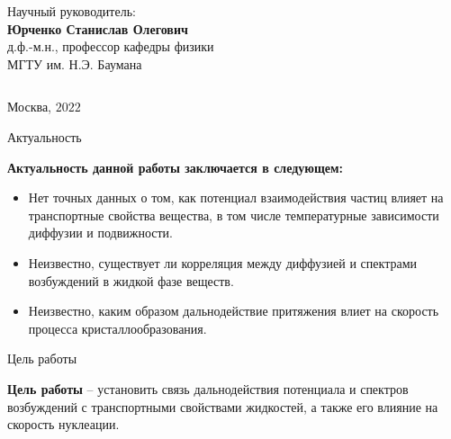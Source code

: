 \documentclass{beamer}
\begin{document}
\begin{frame}
\begin{columns}
\begin{column}{0.50\textwidth}
\begin{center}
\tiny Научный руководитель:\\
\vspace{0.1cm}
\tiny \textbf{Юрченко Станислав Олегович} \\
\tiny д.ф.-м.н., профессор кафедры физики\\
\tiny МГТУ им. Н.Э. Баумана \\
\end{center}


\end{column}
\end{columns}


\vspace{0.5cm}
\begin{center}
\tiny Москва, $2022$
\end{center}
\end{frame}










\begin{frame}{Актуальность}
\footnotesize{

\textbf{Актуальность данной работы заключается в следующем:}
\begin{itemize}
    \item Нет точных данных о том, как потенциал взаимодействия частиц влияет на транспортные свойства вещества, в том числе температурные зависимости диффузии и подвижности.

    \item Неизвестно, существует ли корреляция между диффузией и спектрами возбуждений в жидкой фазе веществ.

    \item Неизвестно, каким образом дальнодействие притяжения влиет на скорость процесса кристаллообразования.

\end{itemize}

}
\end{frame}










\begin{frame}{Цель работы}
\footnotesize{
\textbf{Цель работы} -- установить связь дальнодействия потенциала и спектров возбуждений с транспортными свойствами жидкостей, а также его влияние на скорость нуклеации.

}
\end{frame}
\end{document}

